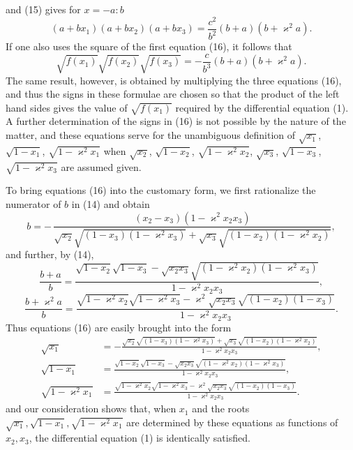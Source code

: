 \documentclass[11pt]{article}
\begin{document}
and (15) gives for $x=-a:b$
\[
(a+bx_1)(a+bx_2)(a+bx_3)
=\frac{c^2}{b^2}(b+a)(b+\varkappa^2a).
\]
If one also uses the square of the first equation (16), it follows that
\[
\sqrt{f(x_1)}\sqrt{f(x_2)}\sqrt{f(x_3)}
=
-\frac{c}{b^3}(b+a)(b+\varkappa^2a).
\]
The same result, however, is obtained by multiplying the three equations (16), and thus the signs in these formulae are chosen so that the product of the left hand sides gives the value of $\sqrt{f(x_1)}$ required by the differential equation (1). A further determination of the signs in (16) is not possible by the nature of the matter, and these equations serve for the unambiguous definition of $\sqrt{x_1}$, $\sqrt{1-x_1}$, $\sqrt{1-\varkappa^2x_1}$ when $\sqrt{x_2}$, $\sqrt{1-x_2}$, $\sqrt{1-\varkappa^2x_2}$, $\sqrt{x_3}$, $\sqrt{1-x_3}$, $\sqrt{1-\varkappa^2x_3}$ are assumed given.

To bring equations (16) into the customary form, we first rationalize the numerator of $b$ in (14) and obtain
\[
b=-\,\frac{(x_2-x_3)(1-\varkappa^2x_2x_3)}
{\sqrt{x_2}\sqrt{(1-x_3)(1-\varkappa^2x_3)}+
\sqrt{x_3}\sqrt{(1-x_2)(1-\varkappa^2x_2)}},
\]
and further, by (14),
\[
\frac{b+a}{b}
=\frac{\sqrt{1-x_2}\sqrt{1-x_3}
-\sqrt{x_2x_3}\sqrt{(1-\varkappa^2x_2)(1-\varkappa^2x_3)}}
{1-\varkappa^2x_2x_3},
\]
\[
\frac{b+\varkappa^2a}{b}
=\frac{\sqrt{1-\varkappa^2x_2}\sqrt{1-\varkappa^2x_3}
-\varkappa^2\sqrt{x_2x_3}\sqrt{(1-x_2)(1-x_3)}}
{1-\varkappa^2x_2x_3}.
\]
Thus equations (16) are easily brought into the form
\begin{equation}
\begin{aligned}
\sqrt{x_1}&=
-\frac{\sqrt{x_2}\sqrt{(1-x_3)(1-\varkappa^2x_3)}
+\sqrt{x_3}\sqrt{(1-x_2)(1-\varkappa^2x_2)}}
{1-\varkappa^2x_2x_3},\\
\sqrt{1-x_1}&=
\frac{\sqrt{1-x_2}\sqrt{1-x_3}
-\sqrt{x_2x_3}\sqrt{(1-\varkappa^2x_2)(1-\varkappa^2x_3)}}
{1-\varkappa^2x_2x_3},\\
\sqrt{1-\varkappa^2x_1}&=
\frac{\sqrt{1-\varkappa^2x_2}\sqrt{1-\varkappa^2x_3}
-\varkappa^2\sqrt{x_2x_3}\sqrt{(1-x_2)(1-x_3)}}
{1-\varkappa^2x_2x_3}.
\end{aligned}
\tag{17}
\end{equation}
and our consideration shows that, when $x_1$ and the roots $\sqrt{x_1},\sqrt{1-x_1},\sqrt{1-\varkappa^2x_1}$ are determined by these equations as functions of $x_2,x_3$, the differential equation (1) is identically satisfied.
\end{document}
